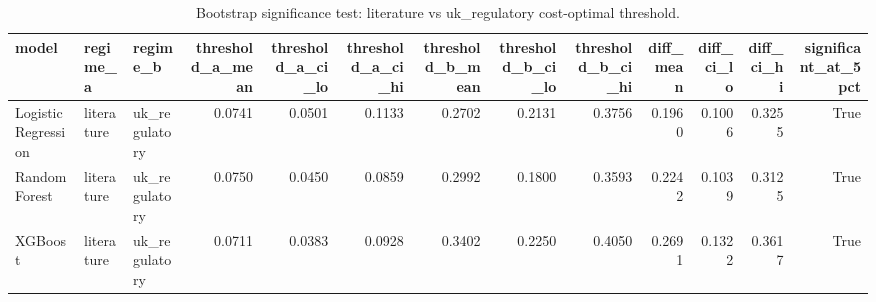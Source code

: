\begin{table}
\caption{Bootstrap significance test: literature vs uk_regulatory cost-optimal threshold.}
\label{tab:table11_bootstrap_significance}
\begin{tabular}{lllrrrrrrrrrr}
\toprule
model & regime\_a & regime\_b & threshold\_a\_mean & threshold\_a\_ci\_lo & threshold\_a\_ci\_hi & threshold\_b\_mean & threshold\_b\_ci\_lo & threshold\_b\_ci\_hi & diff\_mean & diff\_ci\_lo & diff\_ci\_hi & significant\_at\_5pct \\
\midrule
Logistic Regression & literature & uk\_regulatory & 0.0741 & 0.0501 & 0.1133 & 0.2702 & 0.2131 & 0.3756 & 0.1960 & 0.1006 & 0.3255 & True \\
Random Forest & literature & uk\_regulatory & 0.0750 & 0.0450 & 0.0859 & 0.2992 & 0.1800 & 0.3593 & 0.2242 & 0.1039 & 0.3125 & True \\
XGBoost & literature & uk\_regulatory & 0.0711 & 0.0383 & 0.0928 & 0.3402 & 0.2250 & 0.4050 & 0.2691 & 0.1322 & 0.3617 & True \\
\bottomrule
\end{tabular}
\end{table}

